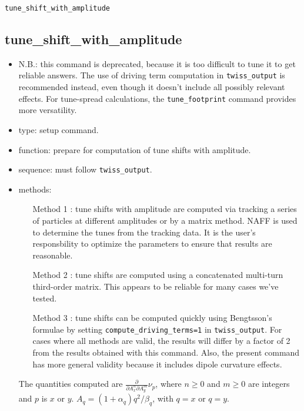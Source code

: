 \documentclass[11pt]{article}
\begin{document}
\newpage
\begin{center}{\Large\verb|tune_shift_with_amplitude|}\end{center}
\subsection{tune\_shift\_with\_amplitude \label{subsec:tuneshiftwithamplitude}}

\begin{itemize}
\item N.B.: this command is deprecated, because it is too difficult to tune it to get
  reliable answers. The use of driving term computation in \verb|twiss_output| is recommended instead, even though it 
  doesn't include all possibly relevant effects. For tune-spread calculations, the \verb|tune_footprint| command provides
  more versatility.
\item type: setup command.
\item function: prepare for computation of tune shifts with amplitude.
\item sequence: must follow \verb|twiss_output|.
\item methods: 
\begin{itemize}
 \item[Method 1]: tune shifts with amplitude are computed via tracking a series of
  particles at different amplitudes or by a matrix method.  NAFF is used to 
  determine the tunes from the tracking data.  It is the user's responsbility to optimize the
  parameters to ensure that results are reasonable.  
 \item[Method 2]: tune shifts are computed using a concatenated multi-turn third-order matrix.
 This appears to be reliable for many cases we've tested.
 \item[Method 3]: tune shifts can be computed quickly using Bengtsson's formulae \cite{Bengtsson} by
 setting \verb|compute_driving_terms=1| in \verb|twiss_output|.  For cases where all methods are
 valid, the results will differ by a factor of 2 from the results obtained with this command.
 Also, the present command has more general validity because it includes dipole curvature effects.
\end{itemize}

The quantities computed are $\frac{\partial}{\partial A_x^n \partial A_y^m}\nu_p$, where $n\geq 0$ and $m \geq 0$ are
integers and $p$ is $x$ or $y$.  $A_q = (1 + \alpha_q) q^2/\beta_q$, with $q=x$ or $q=y$.

\end{itemize}
\end{document}

